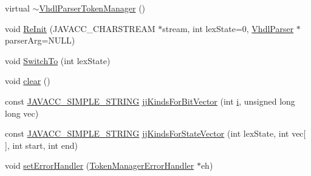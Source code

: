 \begin{DoxyCompactItemize}
\item 
virtual \hyperlink{classvhdl_1_1parser_1_1_vhdl_parser_token_manager_a046c34b2fff4219e7985121e8e24b22b}{$\sim$\+Vhdl\+Parser\+Token\+Manager} ()
\item 
void \hyperlink{classvhdl_1_1parser_1_1_vhdl_parser_token_manager_a8afc0bad1c4eb86e10be77df8206adfb}{Re\+Init} (J\+A\+V\+A\+C\+C\+\_\+\+C\+H\+A\+R\+S\+T\+R\+E\+A\+M $\ast$stream, int lex\+State=0, \hyperlink{classvhdl_1_1parser_1_1_vhdl_parser}{Vhdl\+Parser} $\ast$parser\+Arg=N\+U\+L\+L)
\item 
void \hyperlink{classvhdl_1_1parser_1_1_vhdl_parser_token_manager_a73a2f8822cfb4c49cc36c767f4db42d4}{Switch\+To} (int lex\+State)
\item 
void \hyperlink{classvhdl_1_1parser_1_1_vhdl_parser_token_manager_ab81c7b2c646249e99d68910f5bcd9875}{clear} ()
\item 
const \hyperlink{_java_c_c_8h_ac82c9f0881bc263341157153e0f2ae27}{J\+A\+V\+A\+C\+C\+\_\+\+S\+I\+M\+P\+L\+E\+\_\+\+S\+T\+R\+I\+N\+G} \hyperlink{classvhdl_1_1parser_1_1_vhdl_parser_token_manager_a9335b256d17c011c40bee4abf6cb4ed9}{jj\+Kinds\+For\+Bit\+Vector} (int \hyperlink{060__command__switch_8tcl_a8c90afd4641b25be86bd09983c3cbee0}{i}, unsigned long long vec)
\item 
const \hyperlink{_java_c_c_8h_ac82c9f0881bc263341157153e0f2ae27}{J\+A\+V\+A\+C\+C\+\_\+\+S\+I\+M\+P\+L\+E\+\_\+\+S\+T\+R\+I\+N\+G} \hyperlink{classvhdl_1_1parser_1_1_vhdl_parser_token_manager_a702fc3bb80b5834d8a16d1685b23e0cb}{jj\+Kinds\+For\+State\+Vector} (int lex\+State, int vec\mbox{[}$\,$\mbox{]}, int start, int end)
\item 
void \hyperlink{classvhdl_1_1parser_1_1_vhdl_parser_token_manager_af10e66a2453415cb8f5778d60d4f6dd2}{set\+Error\+Handler} (\hyperlink{classvhdl_1_1parser_1_1_token_manager_error_handler}{Token\+Manager\+Error\+Handler} $\ast$eh)
\end{DoxyCompactItemize}
